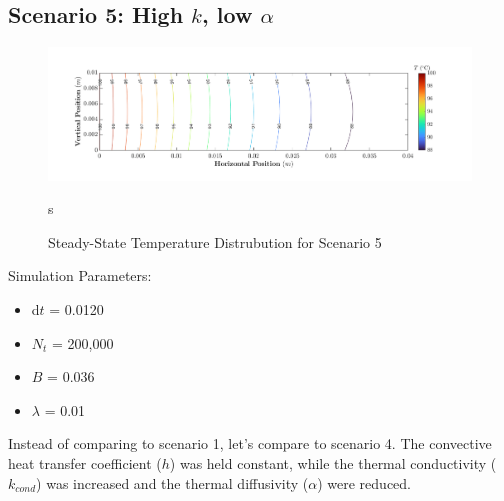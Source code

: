 \documentclass{article}
\begin{document}
\pagebreak

\subsection{Scenario 5: High $k$, low $\alpha$}

\begin{figure}[h]
    \centering
    \includegraphics[width=1\textwidth]{fig/contour5.png}
    \caption{Steady-State Temperature Distrubution for Scenario 5}s
    \label{fig: Plot5}
\end{figure}

Simulation Parameters:
\begin{itemize}
    \item d$t$ = 0.0120
    \item $N_t$ = 200,000
    \item $B$ = 0.036
    \item $\lambda$ = 0.01
\end{itemize}

Instead of comparing to scenario 1, let's compare to scenario 4. The convective heat transfer coefficient ($h$) was held constant, while the thermal conductivity ($k_{cond}$) was increased and the thermal diffusivity ($\alpha$) were reduced. \\
\end{document}
